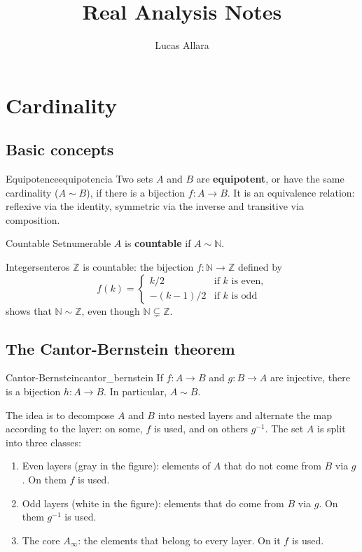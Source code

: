 \documentclass[11pt, a4paper]{article}
\title{
    \vspace{-2cm}
    \textbf{\Huge Real Analysis Notes}\\
    \vspace{0.5cm}
}
\author{Lucas Allara}
\date{}
\begin{document}
\maketitle
\newpage

\tableofcontents
\newpage

\section{Cardinality}

\subsection{Basic concepts}

\begin{definicion}{Equipotence}{equipotencia}
Two sets $A$ and $B$ are \textbf{equipotent}, or have the same cardinality ($A \sim B$), if there is a
bijection $f: A \to B$. It is an equivalence relation: reflexive via the identity, symmetric via
the inverse and transitive via composition.
\end{definicion}

\begin{definicion}{Countable Set}{numerable}
$A$ is \textbf{countable} if $A \sim \mathbb{N}$.
\end{definicion}

\begin{ejemplo}{Integers}{enteros}
$\mathbb{Z}$ is countable: the bijection $f: \mathbb{N} \to \mathbb{Z}$ defined by
$$
f(k) = \begin{cases}
k/2 & \text{if } k \text{ is even,} \\
-(k-1)/2 & \text{if } k \text{ is odd}
\end{cases}
$$
shows that $\mathbb{N} \sim \mathbb{Z}$, even though $\mathbb{N} \subsetneq \mathbb{Z}$.
\end{ejemplo}

\subsection{The Cantor-Bernstein theorem}

\begin{teorema}{Cantor-Bernstein}{cantor_bernstein}
If $f: A \to B$ and $g: B \to A$ are injective, there is a bijection $h: A \to B$. In particular,
$A \sim B$.
\end{teorema}

The idea is to decompose $A$ and $B$ into nested layers and alternate the map according to the layer: on
some, $f$ is used, and on others $g^{-1}$. The set $A$ is split into three classes:
\begin{enumerate}
    \item Even layers (gray in the figure): elements of $A$ that do not come from $B$ via $g$. On
    them $f$ is used.
    \item Odd layers (white in the figure): elements that do come from $B$ via $g$. On
    them $g^{-1}$ is used.
    \item The core $A_\infty$: the elements that belong to every layer. On it $f$ is used.
\end{enumerate}
\end{document}

